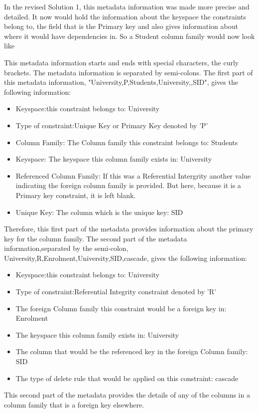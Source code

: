 In the revised Solution 1, this metadata information was made more precise and
detailed. It now would hold the information about the keyspace the constraints
belong to, the field that is the Primary key and also gives information about
where it would have dependencies in. So a Student column family would now look
like

This metadata information starts and ends with special characters, the curly
brackets. The metadata information is separated by semi-colons. The first part
of this metadata information, "University,P,Students,University,,SID", gives the
following information:
\begin{itemize}
\item Keyspace:this constraint belongs to: University
\item Type of constraint:Unique Key or Primary Key denoted by 'P'
\item Column Family: The Column family this constraint belongs to: Students
\item Keyspace: The keyspace this column family exists in: University
\item Referenced Column Family: If this was a Referential Intergrity another
value indicating the foreign column family is provided. But here, because it is a Primary key constraint, it
is left blank.
\item Unique Key: The column which is the unique key: SID
\end{itemize}

Therefore, this first part of the
metadata provides information about the primary key for the column family.
The second part of the metadata information,separated by the semi-colon,
University,R,Enrolment,University,SID,cascade, gives the following information:

\begin {itemize}
\item Keyspace:this constraint belongs to: University
\item Type of constraint:Referential Integrity constraint denoted by 'R'
\item The foreign Column family this
constraint would be a foreign key in: Enrolment
\item The keyspace this column family exists in: University 
\item The column that would be the referenced key in the foreign Column family:
SID 
\item The type of delete rule that would be applied on this constraint:
cascade
\end{itemize}
This second part of the metadata provides the details of any of the columns in a
column family that is a foreign key elsewhere.

